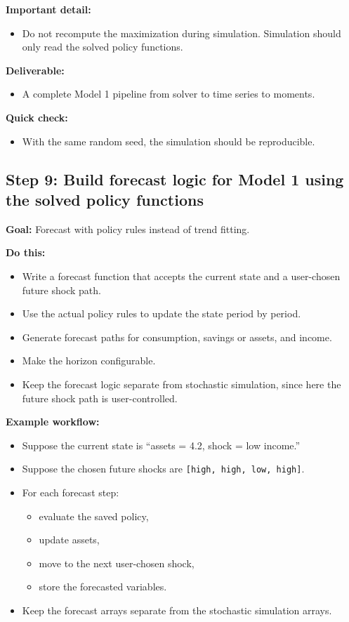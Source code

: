 \documentclass[11pt]{article}
\begin{document}
\textbf{Important detail:}
\begin{itemize}
    \item Do not recompute the maximization during simulation. Simulation should only read the solved policy functions.
\end{itemize}

\textbf{Deliverable:}
\begin{itemize}
    \item A complete Model 1 pipeline from solver to time series to moments.
\end{itemize}

\textbf{Quick check:}
\begin{itemize}
    \item With the same random seed, the simulation should be reproducible.
\end{itemize}

\subsection{Step 9: Build forecast logic for Model 1 using the solved policy functions}
\textbf{Goal:} Forecast with policy rules instead of trend fitting.

\textbf{Do this:}
\begin{itemize}
    \item Write a forecast function that accepts the current state and a user-chosen future shock path.
    \item Use the actual policy rules to update the state period by period.
    \item Generate forecast paths for consumption, savings or assets, and income.
    \item Make the horizon configurable.
    \item Keep the forecast logic separate from stochastic simulation, since here the future shock path is user-controlled.
\end{itemize}

\textbf{Example workflow:}
\begin{itemize}
    \item Suppose the current state is ``assets = 4.2, shock = low income.''
    \item Suppose the chosen future shocks are \verb|[high, high, low, high]|.
    \item For each forecast step:
    \begin{itemize}
        \item evaluate the saved policy,
        \item update assets,
        \item move to the next user-chosen shock,
        \item store the forecasted variables.
    \end{itemize}
    \item Keep the forecast arrays separate from the stochastic simulation arrays.
\end{itemize}
\end{document}
